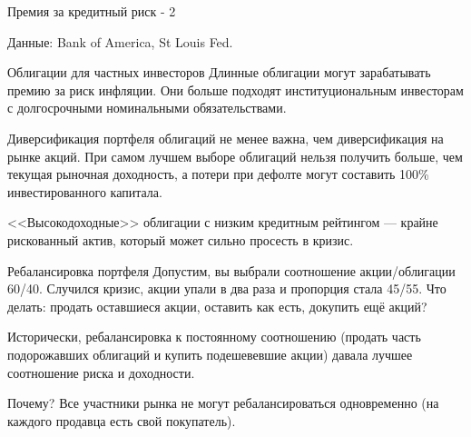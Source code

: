 \documentclass{beamer}
\begin{document}
\begin{frame}{Премия за кредитный риск - 2}
\centering
{}

\centering
\scriptsize Данные: Bank of America, St Louis Fed.
\end{frame}



\begin{frame}{Облигации для частных инвесторов}
\justify
Длинные облигации могут зарабатывать премию за риск инфляции. Они больше подходят институциональным инвесторам с долгосрочными номинальными обязательствами.

\justify
Диверсификация портфеля облигаций не менее важна, чем диверсификация на рынке акций.
При самом лучшем выборе облигаций нельзя получить больше, чем текущая рыночная доходность,
а потери при дефолте могут составить 100\% инвестированного капитала.

\justify
<<Высокодоходные>> облигации с низким кредитным рейтингом --- крайне рискованный актив,
который может сильно просесть в кризис.
\end{frame}



\begin{frame}{Ребалансировка портфеля}
\justify
Допустим, вы выбрали соотношение акции/облигации 60/40. Случился кризис, акции 
упали в два раза и пропорция стала 45/55. Что делать: продать оставшиеся акции, 
оставить как есть, докупить ещё акций?

\justify
Исторически, ребалансировка к постоянному соотношению (продать часть 
подорожавших облигаций и купить подешевевшие акции) давала лучшее соотношение 
риска и доходности.

\justify
Почему? Все участники рынка не могут ребалансироваться 
одновременно (на каждого продавца есть свой покупатель).
\end{frame}
\end{document}
